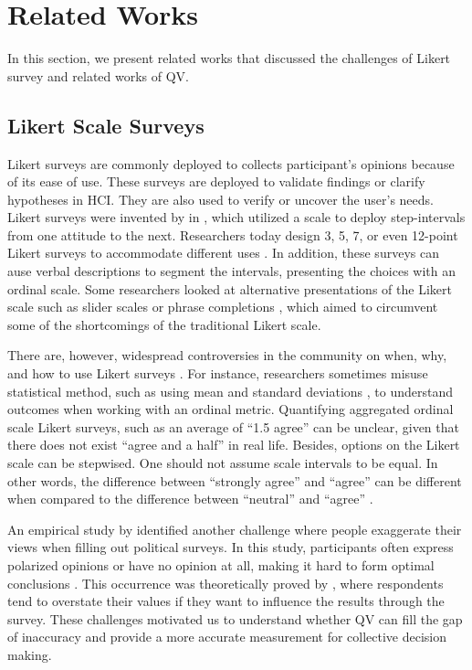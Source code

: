 \section{Related Works} \label{related_works}
In this section, 
we present related works
that discussed the challenges
of Likert survey
and related works of QV.

\subsection{Likert Scale Surveys}
Likert surveys are commonly deployed
to collects participant's opinions
because of its ease of use.
These surveys are deployed
to validate findings or clarify hypotheses
\cite{ozok2009survey, ledo2018evaluation} in HCI.
They are also used to verify or uncover the user's needs.
Likert surveys were invented by \textcite{likert1932technique} 
in \citeyear{likert1932technique},
which utilized a scale to deploy step-intervals 
from one attitude to the next.
Researchers today design 3, 5, 7, 
or even 12-point Likert surveys to accommodate different uses
\cite{garland2008computer,finstad2010}.
In addition, these surveys
can ause verbal descriptions
to segment the intervals,
presenting the choices with an ordinal scale.
Some researchers looked at
alternative presentations of the Likert scale
such as slider scales \cite{roster2015exploring} 
or phrase completions \cite{hodge2003phrase}, 
which aimed to circumvent 
some of the shortcomings of the traditional Likert scale.

There are, however, widespread controversies in the community on
when, why, and how to use Likert surveys \cite{bishop2015use}.
For instance, 
researchers sometimes misuse statistical method,
such as using mean and standard deviations \cite{jamieson2004likert},
to understand outcomes
when working with an ordinal metric.
Quantifying aggregated ordinal scale Likert surveys,
such as an average of ``1.5 agree'' can be unclear,
given that there does not exist ``agree and a half''
in real life.
Besides, 
options on the Likert scale can be stepwised.
One should not assume scale intervals to be equal.
In other words,
the difference between
``strongly agree'' and ``agree'' can be different 
when compared to the difference between
``neutral'' and ``agree'' \cite{jamieson2004likert, edmondson2005likert}.

An empirical study by \textcite{quarfoot2017quadratic}
identified another challenge
where people exaggerate their views
when filling out political surveys.
In this study,
participants often express polarized opinions
or have no opinion at all,
making it hard to form optimal conclusions \cite{posner2018radical}.
This occurrence was 
theoretically proved by \textcite{cavaille2018towards},
where respondents tend to overstate their values
if they want to influence the results through the survey.
These challenges motivated us 
to understand whether QV can fill the gap of inaccuracy
and provide a more accurate measurement
for collective decision making.\par

